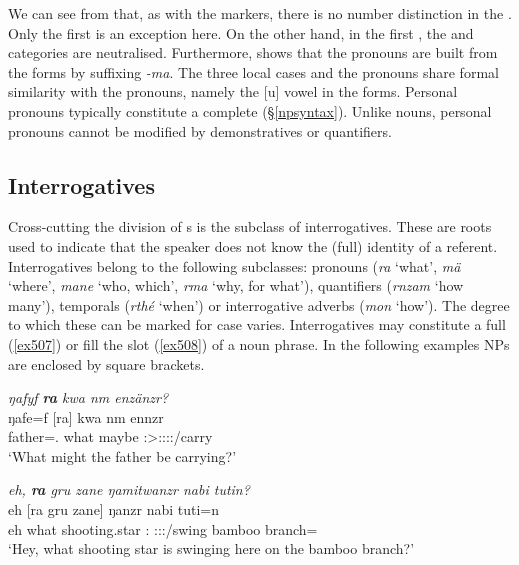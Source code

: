 We can see from  that, as with the  markers, there is no number distinction in the . Only the first  is an exception here. On the other hand, in the first  , the  and  categories are neutralised. Furthermore,  shows that the  pronouns are built from the  forms by suffixing \emph{-ma}. The three local cases and the  pronouns share formal similarity with the  pronouns, namely the [u] vowel in the  forms. Personal pronouns typically constitute a complete  ({\S}\ref{npsyntax}). Unlike nouns, personal pronouns cannot be modified by demonstratives or quantifiers.

\subsection{Interrogatives} \label{interrogatives-sec}

Cross-cutting the division of s is the subclass of interrogatives. These are roots used to indicate that the speaker does not know the (full) identity of a referent. Interrogatives belong to the following  subclasses: pronouns (\emph{ra} `what', \emph{mä} `where', \emph{mane} `who, which', \emph{rma} `why, for what'), quantifiers (\emph{rnzam} `how many'), temporals (\emph{rthé} `when') or interrogative adverbs (\emph{mon} `how'). The degree to which these can be marked for case varies. Interrogatives may constitute a full  (\ref{ex507}) or fill the  slot (\ref{ex508}) of a noun phrase. In the following examples NPs are enclosed by square brackets.

\begin{exe}
	\ex \emph{ŋafyf \textbf{ra} kwa nm enzänzr?}\\
	\gll ŋafe=f [ra] kwa nm ennzr\\
	father=\Erg.{\Sg} what {\Fut} maybe \Stsg:\Sbj>\Stpl:\Obj:\Nonpast:\Ipfv:\Venit/carry\\
	\trans `What might the father be carrying?' 
	\label{ex507}
\end{exe}
\begin{exe}
	\ex \emph{eh, \textbf{ra} gru zane ŋamitwanzr nabi tutin?}\\
	\gll eh [ra gru zane] ŋanzr nabi tuti=n\\
	eh what shooting.star \Dem:{\Prox} \Stsg:\Sbj:\Nonpast:\Ipfv/swing bamboo branch={\Loc}\\
	\trans `Hey, what shooting star is swinging here on the bamboo branch?'\\ 
	\label{ex508}
\end{exe}%

